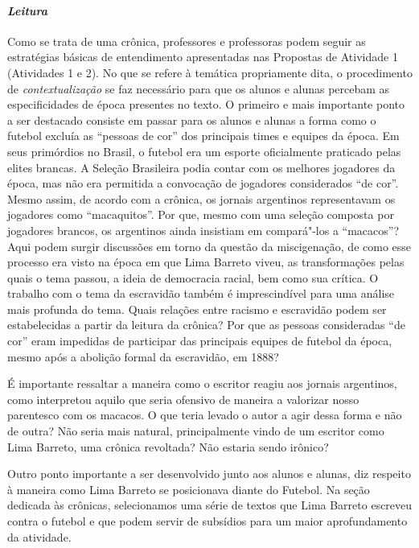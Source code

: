 \documentclass[11pt]{extarticle}
\begin{document}
{{\paragraph{\textit{Leitura}}
Como se trata de uma crônica, professores e professoras podem seguir
as estratégias básicas de entendimento apresentadas nas Propostas de
Atividade 1 (Atividades 1 e 2). No que se refere à temática propriamente
dita, o procedimento de \emph{contextualização} se faz necessário para
que os alunos e alunas percebam as especificidades de época presentes no
texto. O primeiro e mais importante ponto a ser destacado consiste em
passar para os alunos e alunas a forma como o futebol excluía as
``pessoas de cor'' dos principais times e equipes da época. Em seus
primórdios no Brasil, o futebol era um esporte oficialmente praticado
pelas elites brancas. A Seleção Brasileira podia contar com os melhores
jogadores da época, mas não era permitida a convocação de jogadores
considerados ``de cor''. Mesmo assim, de acordo com a crônica, os
jornais argentinos representavam os jogadores como ``macaquitos''. Por
que, mesmo com uma seleção composta por jogadores brancos, os argentinos
ainda insistiam em compará"-los a ``macacos''? Aqui podem surgir
discussões em torno da questão da miscigenação, de como esse processo
era visto na época em que Lima Barreto viveu, as transformações pelas
quais o tema passou, a ideia de democracia racial, bem como sua crítica.
O trabalho com o tema da escravidão também é imprescindível para uma
análise mais profunda do tema. Quais relações entre racismo e escravidão
podem ser estabelecidas a partir da leitura da crônica? Por que as
pessoas consideradas ``de cor'' eram impedidas de participar das
principais equipes de futebol da época, mesmo após a abolição formal da
escravidão, em 1888?


É importante ressaltar a maneira como o escritor reagiu aos jornais
argentinos, como interpretou aquilo que seria ofensivo de maneira a valorizar
nosso parentesco com os macacos. O que teria levado o autor a agir dessa
forma e não de outra? Não seria mais natural, principalmente vindo de um
escritor como Lima Barreto, uma crônica revoltada? Não estaria sendo
irônico?

Outro ponto importante a ser desenvolvido junto aos alunos e alunas,
diz respeito à maneira como Lima Barreto se posicionava diante do
Futebol. Na seção dedicada às crônicas, selecionamos uma série de textos
que Lima Barreto escreveu contra o futebol e que podem servir de
subsídios para um maior aprofundamento da atividade.




}}
\end{document}
